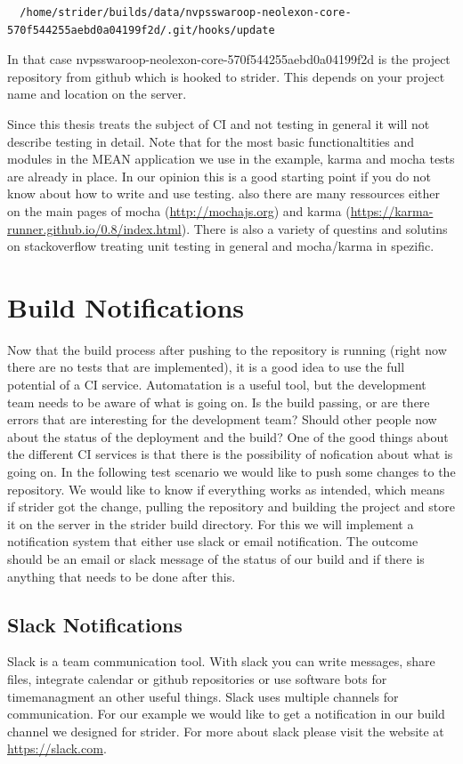\begin{lstlisting}
  /home/strider/builds/data/nvpsswaroop-neolexon-core-570f544255aebd0a04199f2d/.git/hooks/update
\end{lstlisting}

In that case nvpsswaroop-neolexon-core-570f544255aebd0a04199f2d is the project repository from github which is hooked to strider.
This depends on your project name and location on the server.

Since this thesis treats the subject of CI and not testing in general it will not describe testing in detail. Note that for the
most basic functionaltities and modules in the MEAN application we use in the example, karma and mocha tests are already in place.
In our opinion this is a good starting point if you do not know about how to write and use testing. also there are many ressources
either on the main pages of mocha (\url{http://mochajs.org}) and karma (\url{https://karma-runner.github.io/0.8/index.html}). There
is also a variety of questins and solutins on stackoverflow treating unit testing in general and mocha/karma in spezific.

\newpage
\section{Build Notifications}
\label{section:Build Notifications}
Now that the build process after pushing to the repository is running (right now there are no tests that are implemented), it is a
good idea to use the full potential of a CI service. Automatation is a useful tool, but the development team needs to be aware of
what is going on. Is the build passing, or are there errors that are interesting for the development team? Should other people
now about the status of the deployment and the build? One of the good things about the different CI services is that there is the
possibility of nofication about what is going on. In the following test scenario we would like to push some changes to the repository.
We would like to know if everything works as intended, which means if strider got the change, pulling the repository and building the
project and store it on the server in the strider build directory. For this we will implement a notification system that either use
slack or email notification. The outcome should be an email or slack message of the status of our build and if there is anything that
needs to be done after this.

\subsection{Slack Notifications}
Slack is a team communication tool. With slack you can write messages, share files, integrate calendar or github repositories
or use software bots for timemanagment an other useful things. Slack uses multiple channels for communication. For our example we would
like to get a notification in our build channel we designed for strider. For more about slack please visit the website at \url{https://slack.com}.

